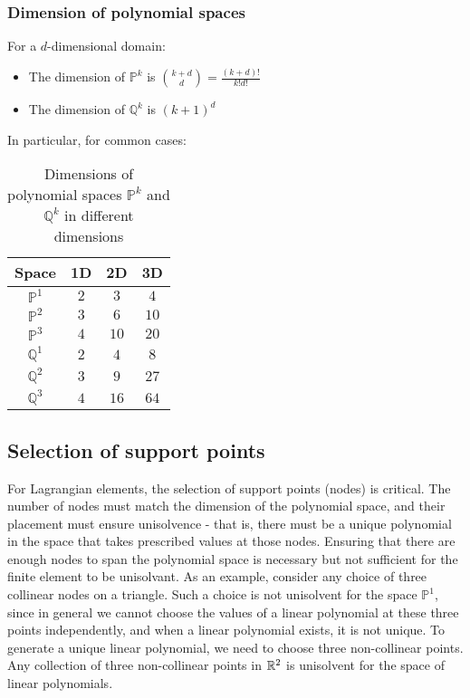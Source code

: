 \subsubsection{Dimension of polynomial spaces}

For a $d$-dimensional domain:

\begin{itemize}
\item The dimension of $\mathbb{P}^k$ is $\binom{k+d}{d} = \frac{(k+d)!}{k!d!}$
\item The dimension of $\mathbb{Q}^k$ is $(k+1)^d$
\end{itemize}

In particular, for common cases:

\begin{table}[h]
\centering
\begin{tabular}{|c|c|c|c|}
\hline
\textbf{Space} & \textbf{1D} & \textbf{2D} & \textbf{3D} \\
\hline
$\mathbb{P}^1$ & $2$ & $3$ & $4$ \\
$\mathbb{P}^2$ & $3$ & $6$ & $10$ \\
$\mathbb{P}^3$ & $4$ & $10$ & $20$ \\
\hline
$\mathbb{Q}^1$ & $2$ & $4$ & $8$ \\
$\mathbb{Q}^2$ & $3$ & $9$ & $27$ \\
$\mathbb{Q}^3$ & $4$ & $16$ & $64$ \\
\hline
\end{tabular}
\caption{Dimensions of polynomial spaces $\mathbb{P}^k$ and $\mathbb{Q}^k$ in different dimensions}
\end{table}

\subsection{Selection of support points}

For Lagrangian elements, the selection of support points (nodes) is critical. The number of nodes must match the dimension of the polynomial space, and their placement must ensure unisolvence - that is, there must be a unique polynomial in the space that takes prescribed values at those nodes. Ensuring that there are enough nodes to span the polynomial space is necessary but not sufficient for the finite element to be unisolvant. As an example, consider any choice of three collinear nodes on a triangle. Such a choice is not unisolvent for the space $\mathbb{P}^1$, since in general we cannot choose the values of a linear polynomial at these three points independently, and when a linear polynomial exists, it is not unique. To generate a unique linear polynomial, we need to choose three non-collinear points. Any collection of three non-collinear points in $\mathbb{R}^2$ is unisolvent for the space of linear polynomials.

